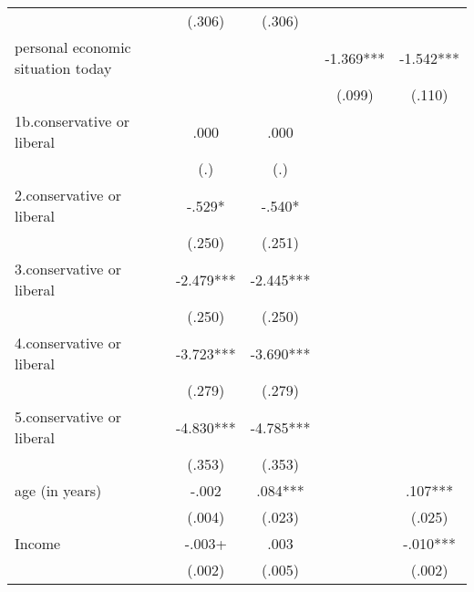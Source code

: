 {\begin{tabular}{l*{4}{c}}
                                                  &      (.306)   &      (.306)   &               &               \\
personal economic situation today                 &               &               &      -1.369***&      -1.542***\\
                                                  &               &               &      (.099)   &      (.110)   \\
1b.conservative or liberal                        &        .000   &        .000   &               &               \\
                                                  &         (.)   &         (.)   &               &               \\
2.conservative or liberal                         &       -.529*  &       -.540*  &               &               \\
                                                  &      (.250)   &      (.251)   &               &               \\
3.conservative or liberal                         &      -2.479***&      -2.445***&               &               \\
                                                  &      (.250)   &      (.250)   &               &               \\
4.conservative or liberal                         &      -3.723***&      -3.690***&               &               \\
                                                  &      (.279)   &      (.279)   &               &               \\
5.conservative or liberal                         &      -4.830***&      -4.785***&               &               \\
                                                  &      (.353)   &      (.353)   &               &               \\
age (in years)                                    &       -.002   &        .084***&               &        .107***\\
                                                  &      (.004)   &      (.023)   &               &      (.025)   \\
Income                                            &       -.003+  &        .003   &               &       -.010***\\
                                                  &      (.002)   &      (.005)   &               &      (.002)   \\

\end{tabular}}
